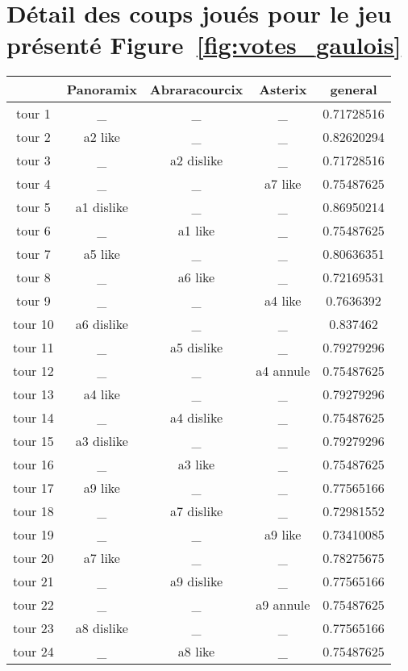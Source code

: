 \documentclass[11pt]{article}
\theoremstyle{defi}
\theoremstyle{not}
\theoremstyle{prob}
\begin{document}
    \section{Détail des coups joués pour le jeu présenté Figure~\ref{fig:votes_gaulois}}
    \begin{tabular}{|c|c|c|c|c|}
    \hline
    & Panoramix & Abraracourcix & Asterix & general \\
    \hline
    tour 1 & \_ & \_ & \_ & 0.71728516 \\
    \hline
    tour 2 & a2 like & \_ & \_ & 0.82620294 \\
    \hline
    tour 3 & \_ & a2 dislike & \_ & 0.71728516 \\
    \hline
    tour 4 & \_ & \_ & a7 like & 0.75487625 \\
    \hline
    tour 5 & a1 dislike & \_ & \_ & 0.86950214 \\
    \hline
    tour 6 & \_ & a1 like & \_ & 0.75487625 \\
    \hline
    tour 7 & a5 like & \_ & \_ & 0.80636351 \\
    \hline
    tour 8 & \_ & a6 like & \_ & 0.72169531 \\
    \hline
    tour 9 & \_ & \_ & a4 like & 0.7636392 \\
    \hline
    tour 10 & a6 dislike & \_ & \_ & 0.837462 \\
    \hline
    tour 11 & \_ & a5 dislike & \_ & 0.79279296 \\
    \hline
    tour 12 & \_ & \_ & a4 annule & 0.75487625 \\
    \hline
    tour 13 & a4 like & \_ & \_ & 0.79279296 \\
    \hline
    tour 14 & \_ & a4 dislike & \_ & 0.75487625 \\
    \hline
    tour 15 & a3 dislike & \_ & \_ & 0.79279296 \\
    \hline
    tour 16 & \_ & a3 like & \_ & 0.75487625 \\
    \hline
    tour 17 & a9 like & \_ & \_ & 0.77565166 \\
    \hline
    tour 18 & \_ & a7 dislike & \_ & 0.72981552 \\
    \hline
    tour 19 & \_ & \_ & a9 like & 0.73410085 \\
    \hline
    tour 20 & a7 like & \_ & \_ & 0.78275675 \\
    \hline
    tour 21 & \_ & a9 dislike & \_ & 0.77565166 \\
    \hline
    tour 22 & \_ & \_ & a9 annule & 0.75487625 \\
    \hline
    tour 23 & a8 dislike & \_ & \_ & 0.77565166 \\
    \hline
    tour 24 & \_ & a8 like & \_ & 0.75487625 \\
    \hline
    \end{tabular}

\end{document}
